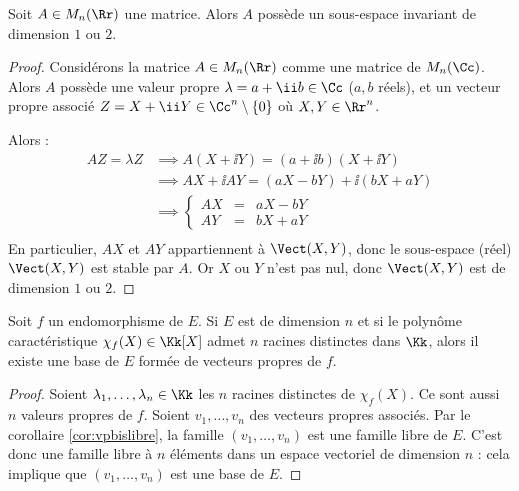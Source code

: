 \documentclass[12pt, class=report,crop=false]{standalone}
\begin{document}
\begin{exemple}
Soit $A \in M_n(\Rr)$ une matrice.
Alors $A$ possède un sous-espace invariant de dimension $1$ ou $2$.

\begin{proof}
Considérons la matrice $A \in M_n(\Rr)$ comme une matrice de ${M}_n(\Cc)$.
Alors $A$ possède une valeur propre $\lambda = a+\ii b \in \Cc$ ($a,b$ réels), et un  vecteur propre associé 
 $Z=X+\ii Y \in \Cc^n \setminus\{0\}$ 
où $X,Y \in \Rr^n$. 

Alors :
\begin{align*}
A Z  = \lambda Z 
  &\implies A(X+\ii Y) = (a+\ii b)(X+\ii Y) \\
  &\implies AX + \ii AY = (aX -bY) + \ii (bX+aY) \\
  &\implies \left\{\begin{array}{rcl} AX &=& aX-bY \\ AY &=& bX +a Y \end{array}\right. \\
\end{align*}
En particulier, $AX$ et $AY$ appartiennent à $\Vect(X,Y)$, donc le sous-espace (réel) $\Vect(X,Y)$ est stable par $A$. 
Or $X$ ou $Y$ n'est pas nul, donc $\Vect(X, Y)$ est de dimension $1$ ou $2$. 
\end{proof}
\end{exemple}


\begin{exemple}
Soit $f$ un endomorphisme de $E$. Si $E$ est de dimension $n$ et si le polynôme caractéristique 
$\chi_f(X) \in \Kk[X]$ admet $n$ racines distinctes dans $\Kk$, alors il existe une base 
de $E$ formée de vecteurs propres de $f$.

\begin{proof}
Soient $\lambda_1,\ldots,\lambda_n \in \Kk$ les $n$ racines distinctes de $\chi_f(X)$. 
Ce sont aussi $n$ valeurs propres de $f$. 
Soient $v_1,\ldots,v_n$ des vecteurs propres associés.
Par le corollaire \ref{cor:vpbislibre}, la famille $(v_1,\ldots,v_n)$ est une famille libre de $E$.
C'est donc une famille libre à $n$ éléments dans un espace vectoriel de dimension $n$ : cela implique
que $(v_1,\ldots,v_n)$ est une base de $E$.
\end{proof}

\end{exemple}
\end{document}
